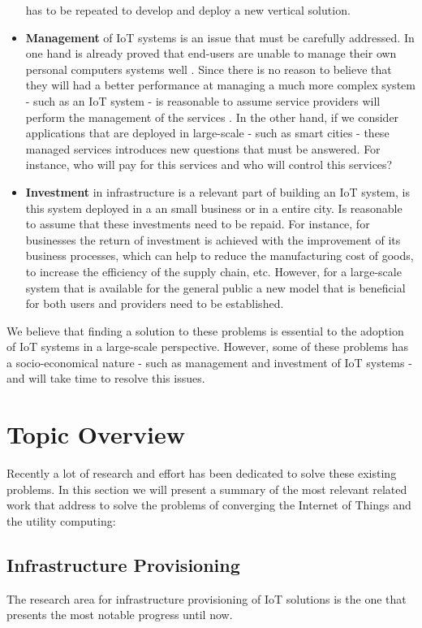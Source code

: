 \begin{itemize}
  has to be repeated to develop and deploy a new vertical solution.
  \item \textbf{Management} of IoT systems is an issue that must be carefully addressed. In one hand
  is already proved that end-users are unable to manage their own personal computers systems well
  \cite{doll1988measurement}. Since there is no reason to believe that they will had a better
  performance at managing a much more complex system - such as an \gls{IoT} system - is reasonable to
  assume service providers will perform the management of the services . In the other hand, if we
  consider applications that are deployed in large-scale - such as smart cities - these managed
  services introduces new questions that must be answered. For instance, who will pay for this
  services and who will control this services?
  \item \textbf{Investment} in infrastructure is a relevant part of building an \gls{IoT} system,
  is this system deployed in a an small business or in a entire city. Is reasonable to assume that
  these investments need to be repaid. For instance, for businesses the return of investment is
  achieved with the improvement of its business processes, which can help to reduce the manufacturing
  cost of goods, to increase the efficiency of the supply chain, etc. However, for a large-scale
  system that is available for the general public a new model that is beneficial for both users and
  providers need to be established.
\end{itemize}

We believe that finding a solution to these problems is essential to the adoption of \gls{IoT} systems
in a large-scale perspective. However, some of these problems has a socio-economical nature - such as
management and investment of \gls{IoT} systems - and will take time to resolve this issues.

\section{Topic Overview}
\label{section:overview}
Recently a lot of research and effort has been dedicated to solve these existing problems. In this
section we will present a summary of the most relevant related work that address to solve the
problems of converging the Internet of Things and the utility computing:

\subsection{Infrastructure Provisioning}
\label{sub:provisioning}
The research area for infrastructure provisioning of IoT solutions is the one that presents the most
notable progress until now.

